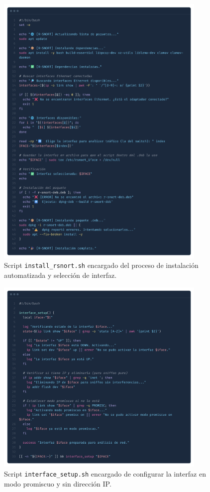 \documentclass[12pt,a4paper]{report}
\begin{document}
\begin{figure}[H]
	\centering
	\includegraphics[width=0.9\textwidth]{script_automatico/18.png}
	\caption{Script \texttt{install\_rsnort.sh} encargado del proceso de instalación automatizada y selección de interfaz.}
	\label{fig:install_rsnort}
\end{figure}

\begin{figure}[H]
	\centering
	\includegraphics[width=0.9\textwidth]{script_automatico/19.png}
	\caption{Script \texttt{interface\_setup.sh} encargado de configurar la interfaz en modo promiscuo y sin dirección IP.}
	\label{fig:interface_setup}
\end{figure}
\end{document}

